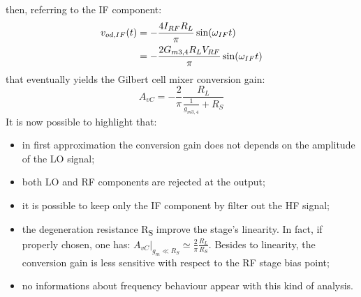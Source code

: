 then, referring to the IF component:
\begin{align}
v_{od,IF}(t)& = -\frac{4I_{RF}R_L}{\pi}\sin(\omega_{IF} t) \notag \\
& = -\frac{2G_{m3,4}R_LV_{RF}}{\pi}\sin(\omega_{IF} t) 
\end{align}
that eventually yields the Gilbert cell mixer conversion gain:
\begin{equation}
\label{eq:ConvGain}
A_{vC} = -\frac{2}{\pi}\frac{R_L}{\frac{1}{g_{m3,4}}+R_S}
\end{equation}
It is now possible to highlight that:
\begin{itemize}
	\item in first approximation the conversion gain does not depends on the amplitude of the LO signal;
	\item both LO and RF components are rejected at the output;
	\item it is possible to keep only the IF component by filter out the HF signal;
	\item the degeneration resistance R\textsubscript{S} improve the stage's linearity. In fact, if properly chosen, one has: $A_{vC}|_{g_m \ll R_S}\simeq\frac{2}{\pi}\frac{R_L}{R_S}$. Besides to linearity, the conversion gain is less sensitive with respect to the RF stage bias point;
	\item no informations about frequency behaviour appear with this kind of analysis.
\end{itemize}  


